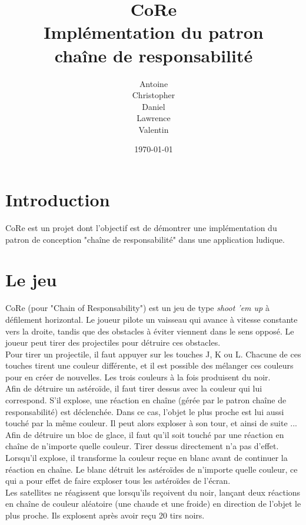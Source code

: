 \documentclass[11pt,a4paper,twoside,svgnames]{article}
\title{\color{Chocolate}\huge\bfseries CoRe\\Implémentation du patron\\chaîne de responsabilité}
\author{Antoine \bsc{Friant}\\
Christopher \bsc{Meier}\\
Daniel \bsc{Palumbo}\\
Lawrence \bsc{Stalder}\\
Valentin \bsc{Finini}}
\date{\today}
\begin{document}
\maketitle
\clearpage
\tableofcontents
\clearpage
\section{Introduction}
CoRe est un projet dont l'objectif est de démontrer une implémentation du patron de conception "chaîne de responsabilité" dans une application ludique.

\section{Le jeu}
CoRe (pour "Chain of Responsability") est un jeu de type \textit{shoot 'em up} à défilement horizontal. Le joueur pilote un vaisseau qui avance à vitesse constante vers la droite, tandis que des obstacles à éviter viennent dans le sens opposé. Le joueur peut tirer des projectiles pour détruire ces obstacles.\\

Pour tirer un projectile, il faut appuyer sur les touches J, K ou L. Chacune de ces touches tirent une couleur différente, et il est possible des mélanger ces couleurs pour en créer de nouvelles. Les trois couleurs à la fois produisent du noir.\\

Afin de détruire un astéroïde, il faut tirer dessus avec la couleur qui lui correspond. S'il explose, une réaction en chaîne (gérée par le patron chaîne de responsabilité) est déclenchée. Dans ce cas, l'objet le plus proche est lui aussi touché par la même couleur. Il peut alors exploser à son tour, et ainsi de suite ...\\

Afin de détruire un bloc de glace, il faut qu'il soit touché par une réaction en chaîne de n'importe quelle couleur. Tirer dessus directement n'a pas d'effet. Lorsqu'il explose, il transforme la couleur reçue en blanc avant de continuer la réaction en chaîne. Le blanc détruit les astéroïdes de n'importe quelle couleur, ce qui a pour effet de faire exploser tous les astéroïdes de l'écran.\\

Les satellites ne réagissent que lorsqu'ils reçoivent du noir, lançant deux réactions en chaîne de couleur aléatoire (une chaude et une froide) en direction de l'objet le plus proche. Ils explosent après avoir reçu 20 tirs noirs.\\
\end{document}
